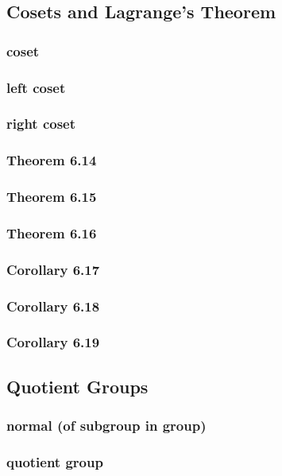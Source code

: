 \documentclass[a4paper]{article}
\begin{document}
\subsection{Cosets and Lagrange's Theorem}   %
\subsubsection*{coset}
\subsubsection*{left coset}
\subsubsection*{right coset}
\subsubsection*{Theorem 6.14}
\subsubsection*{Theorem 6.15}
\subsubsection*{Theorem 6.16}
\subsubsection*{Corollary 6.17}
\subsubsection*{Corollary 6.18}
\subsubsection*{Corollary 6.19}

\newpage
\subsection{Quotient Groups}   %
\subsubsection*{normal (of subgroup in group)}
\subsubsection*{quotient group}
\end{document}
